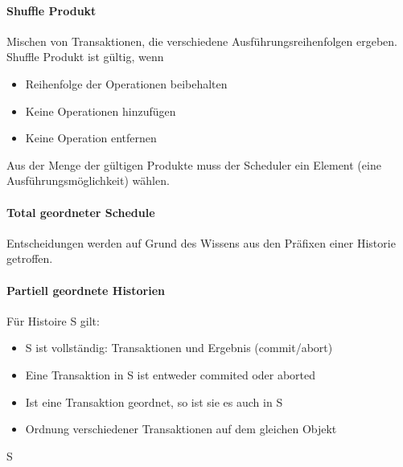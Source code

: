 \documentclass[ngerman]{scrartcl}
\begin{document}
\paragraph*{Shuffle Produkt} Mischen von Transaktionen, die verschiedene Ausführungsreihenfolgen ergeben. Shuffle Produkt ist gültig, wenn 
\begin{itemize}
  \item Reihenfolge der Operationen beibehalten
  \item Keine Operationen hinzufügen
  \item Keine Operation entfernen
\end{itemize} 
Aus der Menge der gültigen Produkte muss der Scheduler ein Element (eine Ausführungsmöglichkeit) wählen.

\paragraph*{Total geordneter Schedule}
Entscheidungen werden auf Grund des Wissens aus den Präfixen einer Historie getroffen.

\paragraph*{Partiell geordnete Historien}
Für Histoire S gilt:
\begin{itemize}
  \item S ist vollständig: Transaktionen und Ergebnis (commit/abort)
  \item Eine Transaktion in S ist entweder commited oder aborted
  \item Ist eine Transaktion geordnet, so ist sie es auch in S
  \item Ordnung verschiedener Transaktionen auf dem gleichen Objekt
\end{itemize}
S 
\end{document}
